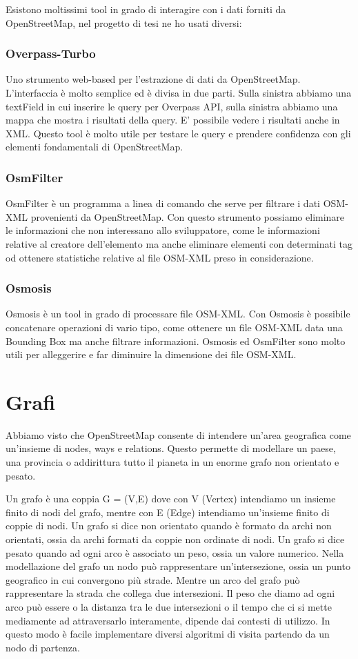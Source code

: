 \documentclass[12pt,a4paper,openright,twoside]{report}
\begin{document}
Esistono moltissimi tool in grado di interagire con i dati forniti da OpenStreetMap, nel progetto di tesi ne ho usati diversi:
\subsubsection{Overpass-Turbo} Uno strumento web-based per l'estrazione di dati da OpenStreetMap. L'interfaccia è molto semplice ed è divisa in due parti. Sulla sinistra abbiamo una textField in cui inserire le query per Overpass API, sulla sinistra abbiamo una mappa che mostra i risultati della query. E' possibile vedere i risultati anche in XML. Questo tool è molto utile per testare le query e prendere confidenza con gli elementi fondamentali di OpenStreetMap.

\subsubsection{OsmFilter} OsmFilter è un programma a linea di comando che serve per filtrare i dati OSM-XML provenienti da OpenStreetMap. Con questo strumento possiamo eliminare le informazioni che non interessano allo sviluppatore, come le informazioni relative al creatore dell'elemento ma anche eliminare elementi con determinati tag od ottenere statistiche relative al file OSM-XML preso in considerazione. 

\subsubsection{Osmosis} Osmosis è un tool in grado di processare file OSM-XML. Con Osmosis è possibile concatenare operazioni di vario tipo, come ottenere un file OSM-XML data una Bounding Box ma anche filtrare informazioni. Osmosis ed OsmFilter sono molto utili per alleggerire e far diminuire la dimensione dei file OSM-XML.

\newpage
\section{Grafi}
Abbiamo visto che OpenStreetMap consente di intendere un'area geografica come un'insieme di nodes, ways e relations. 
Questo permette di modellare un paese, una provincia o addirittura tutto il pianeta in un enorme grafo non orientato e pesato.

Un grafo è una coppia G = (V,E) dove con V (Vertex) intendiamo un insieme finito di nodi del grafo, mentre con E (Edge) intendiamo un'insieme finito di coppie di nodi. Un grafo si dice non orientato quando è formato da archi non orientati, ossia da archi formati da coppie non ordinate di nodi. Un grafo si dice pesato quando ad ogni arco è associato un peso, ossia un valore numerico.
Nella modellazione del grafo un nodo può rappresentare un'intersezione, ossia un punto geografico in cui convergono più strade. Mentre un arco del grafo può rappresentare la strada che collega due intersezioni.
Il peso che diamo ad ogni arco può essere o la distanza tra le due intersezioni o il tempo che ci si mette mediamente ad attraversarlo interamente, dipende dai contesti di utilizzo.
In questo modo è facile implementare diversi algoritmi di visita partendo da un nodo di partenza.
\end{document}
